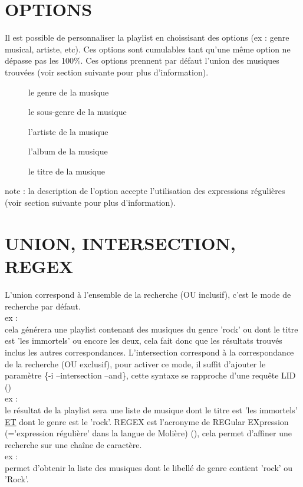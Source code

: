 \documentclass[french]{article}
\begin{document}
\section{OPTIONS}
Il est possible de personnaliser la playlist en choissisant des options (ex : genre musical, artiste, etc).
Ces options sont cumulables tant qu'une même option ne dépasse pas les 100\%.
Ces options prennent par défaut l'union des musiques trouvées (voir section suivante pour plus d'information).
\begin{description}
\item[] le genre de la musique
\item[] le sous-genre de la musique
\item[] l'artiste de la musique
\item[] l'album de la musique
\item[] le titre de la musique
\end{description}
note : la description de l'option accepte l'utilisation des expressions régulières (voir section suivante pour plus d'information).

\section{UNION, INTERSECTION, REGEX}
L'union correspond à l'ensemble de la recherche (OU inclusif), c'est le mode de recherche par défaut.\\
ex : \\
cela générera une playlist contenant des musiques du genre 'rock' ou dont le titre est 'les immortels' ou encore les deux, cela fait donc que les résultats trouvés inclus les autres correspondances.
\newline
\newline
L'intersection correspond à la correspondance de la recherche (OU exclusif), pour activer ce mode, il suffit d'ajouter le paramètre \{-i --intersection --and\}, cette syntaxe se rapproche d'une requête LID ()\\
ex : \\
le résultat de la playlist sera une liste de musique dont le titre est 'les immortels' \underline{ET} dont le genre est le 'rock'.
\newline
\newline
REGEX est l'acronyme de REGular EXpression (='expression régulière' dans la langue de Molière) (), cela permet d'affiner une recherche sur une chaîne de caractère.\\
ex : \\
permet d'obtenir la liste des musiques dont le libellé de genre contient 'rock' ou 'Rock'.
\end{document}
